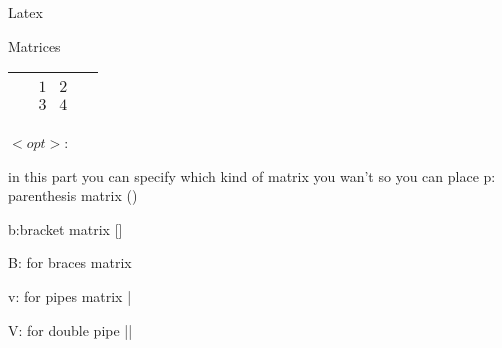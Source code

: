 \begin{section}{Latex}
\begin{subsection}{Matrices}
\begin{tabular}{ |m{5cm}|m{5cm}|m{5cm}|  }
			& 
			$	
			\begin{matrix}
				1 & 2 \\ 
				3 & 4
			\end{matrix}
			$
			\\
			\hline
		\end{tabular}
		 $<opt>$:
		
		in this part you can specify which kind of matrix you wan't so you can place 
			p: parenthesis matrix ()
			
			b:bracket matrix []
		
			B: for braces matrix {}
			
			v: for pipes matrix |
		
			V: for double pipe ||
		
		
	
	
	\end{subsection}
\end{section}
